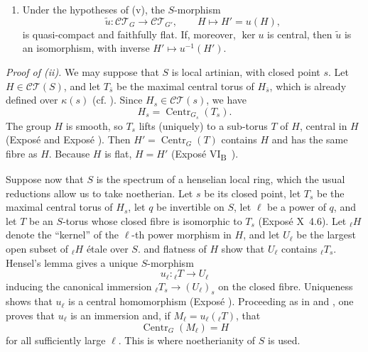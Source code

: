 {\begin{enumerate}
morphism, so that \(G'\) satisfies the same hypotheses as \(G\) (Exposé
VI\textsubscript{B}~9). If
\(H\in\mathcal{CT}_G(S)\), its image is represented by a subgroup
prescheme \(H'\in\mathcal{CT}_{G'}(S)\), and \(H\to H'\) is faithfully
flat. If \(H=\operatorname{Centr}_G(T)\) for a torus \(T\), then
\[
 H'=\operatorname{Centr}_{G'}(T'),\qquad T'=u(T).
\]
\item{} Under the hypotheses of (v), the \(S\)-morphism
\[
 \widetilde u:\mathcal{CT}_G\longrightarrow\mathcal{CT}_{G'},
 \qquad H\longmapsto H'=u(H),
\]
is quasi-compact and faithfully flat. If, moreover, \(\ker u\) is
central, then \(\widetilde u\) is an isomorphism, with inverse
\(H'\mapsto u^{-1}(H')\).
\end{enumerate}}

\medskip\noindent\textit{Proof of (ii).}
We may suppose that \(S\) is local artinian,
with closed point \(s\). Let \(H\in\mathcal{CT}(S)\), and let \(T_{\bar s}\)
be the maximal central torus of \(H_{\bar s}\), which is already defined over
\(\kappa(s)\) (cf. ). Since
\(H_s\in\mathcal{CT}(s)\), we have
\[
  H_s=\operatorname{Centr}_{G_s}(T_s).
\]
The group \(H\) is smooth, so \(T_s\) lifts (uniquely) to a sub-torus \(T\) of
\(H\), central in \(H\) (Exposé  and Exposé ). Then
\(H'=\operatorname{Centr}_G(T)\) contains \(H\) and has the same
fibre as \(H\). Because \(H\) is flat, \(H=H'\) (Exposé
VI\textsubscript{B}~).

Suppose now that \(S\) is the spectrum of a henselian local ring,
which the usual reductions allow us to take noetherian. Let \(s\) be
its closed point, let \(T_s\) be the maximal central torus of \(H_s\),
let \(q\) be invertible on \(S\), let \(\ell\) be a power of \(q\),
and let \(T\) be an \(S\)-torus whose closed fibre is isomorphic to
\(T_s\) (Exposé X~4.6). Let \({}_\ell H\) denote the ``kernel'' of
the \(\ell\)-th power morphism in \(H\), and let \(U_\ell\) be the
largest open subset of \({}_\ell H\) étale over \(S\).  and
flatness of \(H\) show that \(U_\ell\) contains \({}_\ell T_s\).
Hensel's lemma gives a unique \(S\)-morphism
\[
  u_\ell:{}_\ell T\longrightarrow U_\ell
\]
inducing the canonical immersion
\({}_\ell T_s\to(U_\ell)_s\) on the closed fibre. Uniqueness shows
that \(u_\ell\) is a central homomorphism (Exposé ).
Proceeding as in  and , one proves that \(u_\ell\) is an
immersion and, if \(M_\ell=u_\ell({}_\ell T)\), that
\[
  \operatorname{Centr}_G(M_\ell)=H
\]
for all sufficiently large \(\ell\). This is where noetherianity of
\(S\) is used.

